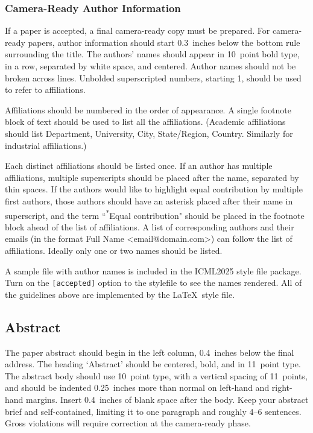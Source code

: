 \documentclass{article}
\theoremstyle{plain}
\theoremstyle{definition}
\theoremstyle{remark}
\begin{document}
\subsubsection{Camera-Ready Author Information}
\label{final author}

If a paper is accepted, a final camera-ready copy must be prepared.
%
For camera-ready papers, author information should start 0.3~inches below the
bottom rule surrounding the title. The authors' names should appear in 10~point
bold type, in a row, separated by white space, and centered. Author names should
not be broken across lines. Unbolded superscripted numbers, starting 1, should
be used to refer to affiliations.

Affiliations should be numbered in the order of appearance. A single footnote
block of text should be used to list all the affiliations. (Academic
affiliations should list Department, University, City, State/Region, Country.
Similarly for industrial affiliations.)

Each distinct affiliations should be listed once. If an author has multiple
affiliations, multiple superscripts should be placed after the name, separated
by thin spaces. If the authors would like to highlight equal contribution by
multiple first authors, those authors should have an asterisk placed after their
name in superscript, and the term ``\textsuperscript{*}Equal contribution"
should be placed in the footnote block ahead of the list of affiliations. A
list of corresponding authors and their emails (in the format Full Name
\textless{}email@domain.com\textgreater{}) can follow the list of affiliations.
Ideally only one or two names should be listed.

A sample file with author names is included in the ICML2025 style file
package. Turn on the \texttt{[accepted]} option to the stylefile to
see the names rendered. All of the guidelines above are implemented
by the \LaTeX\ style file.

\subsection{Abstract}

The paper abstract should begin in the left column, 0.4~inches below the final
address. The heading `Abstract' should be centered, bold, and in 11~point type.
The abstract body should use 10~point type, with a vertical spacing of
11~points, and should be indented 0.25~inches more than normal on left-hand and
right-hand margins. Insert 0.4~inches of blank space after the body. Keep your
abstract brief and self-contained, limiting it to one paragraph and roughly 4--6
sentences. Gross violations will require correction at the camera-ready phase.
\end{document}
